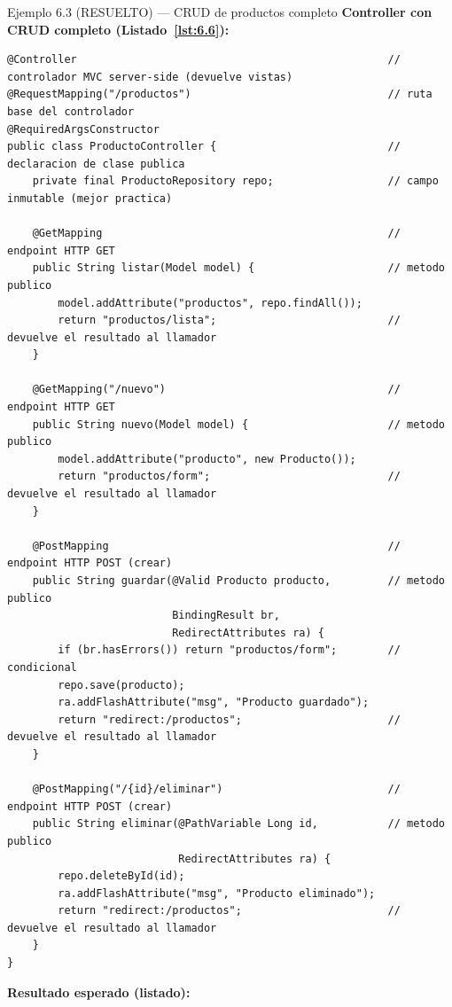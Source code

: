 \documentclass[11pt,a4paper,openany]{book}
\begin{document}
\begin{cajaejemplo}{Ejemplo 6.3 (RESUELTO) --- CRUD de productos completo}
\textbf{Controller con CRUD completo (Listado~\ref{lst:6.6}):}
\begin{lstlisting}[style=java,caption={ProductoController.java},label=lst:6.6]
@Controller                                                 // controlador MVC server-side (devuelve vistas)
@RequestMapping("/productos")                               // ruta base del controlador
@RequiredArgsConstructor
public class ProductoController {                           // declaracion de clase publica
    private final ProductoRepository repo;                  // campo inmutable (mejor practica)

    @GetMapping                                             // endpoint HTTP GET
    public String listar(Model model) {                     // metodo publico
        model.addAttribute("productos", repo.findAll());
        return "productos/lista";                           // devuelve el resultado al llamador
    }

    @GetMapping("/nuevo")                                   // endpoint HTTP GET
    public String nuevo(Model model) {                      // metodo publico
        model.addAttribute("producto", new Producto());
        return "productos/form";                            // devuelve el resultado al llamador
    }

    @PostMapping                                            // endpoint HTTP POST (crear)
    public String guardar(@Valid Producto producto,         // metodo publico
                          BindingResult br,
                          RedirectAttributes ra) {
        if (br.hasErrors()) return "productos/form";        // condicional
        repo.save(producto);
        ra.addFlashAttribute("msg", "Producto guardado");
        return "redirect:/productos";                       // devuelve el resultado al llamador
    }

    @PostMapping("/{id}/eliminar")                          // endpoint HTTP POST (crear)
    public String eliminar(@PathVariable Long id,           // metodo publico
                           RedirectAttributes ra) {
        repo.deleteById(id);
        ra.addFlashAttribute("msg", "Producto eliminado");
        return "redirect:/productos";                       // devuelve el resultado al llamador
    }
}
\end{lstlisting}

\textbf{Resultado esperado (listado):}


\end{cajaejemplo}
\end{document}
